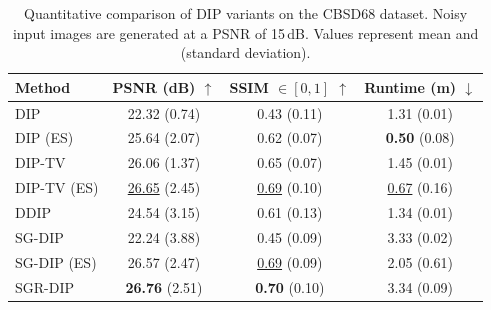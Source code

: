 \begin{table}
    \small
    \centering
    \begin{tabular}{ l c c c }
        \toprule
        Method &PSNR (dB) $\uparrow$ &SSIM $\in [0,1]$ $\uparrow$ &Runtime (m) $\downarrow$\\
        \midrule
        DIP &22.32 {\scriptsize (0.74)} &0.43 {\scriptsize (0.11)} &1.31 {\scriptsize (0.01)} \\
        DIP (ES) &25.64 {\scriptsize (2.07)} &0.62 {\scriptsize (0.07)} &\textbf{0.50} {\scriptsize (0.08)} \\
        DIP-TV &26.06 {\scriptsize (1.37)} &0.65 {\scriptsize (0.07)} &1.45 {\scriptsize (0.01)} \\
        DIP-TV (ES) &\underline{26.65} {\scriptsize (2.45)} &\underline{0.69} {\scriptsize (0.10)} &\underline{0.67} {\scriptsize (0.16)} \\
        DDIP &24.54 {\scriptsize (3.15)} &0.61 {\scriptsize (0.13)} &1.34 {\scriptsize (0.01)} \\
        SG-DIP &22.24 {\scriptsize (3.88)} &0.45 {\scriptsize (0.09)} &3.33 {\scriptsize (0.02)} \\
        SG-DIP (ES) &26.57 {\scriptsize (2.47)} &\underline{0.69} {\scriptsize (0.09)} &2.05 {\scriptsize (0.61)} \\
        SGR-DIP &\textbf{26.76} {\scriptsize (2.51)} &\textbf{0.70} {\scriptsize (0.10)} &3.34 {\scriptsize (0.09)} \\
        \bottomrule
    \end{tabular}
    \caption{
        Quantitative comparison of DIP variants on the CBSD68 dataset.
        Noisy input images are generated at a PSNR of 15\,dB.
        Values represent mean and {\scriptsize (standard deviation)}.
    }\label{tab:CBSD68}
\end{table}

